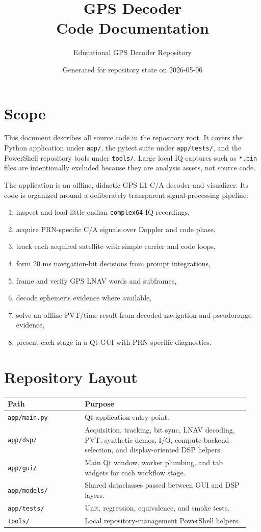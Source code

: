 \documentclass[11pt,a4paper]{article}
\title{GPS Decoder\\Code Documentation}
\author{Educational GPS Decoder Repository}
\date{Generated for repository state on 2026-05-06}
\newcommand{\codepath}[1]{\nolinkurl{#1}}
\begin{document}
\maketitle
\tableofcontents
\newpage

\section{Scope}

This document describes all source code in the repository root. It covers the Python application under \codepath{app/}, the pytest suite under \codepath{app/tests/}, and the PowerShell repository tools under \codepath{tools/}. Large local IQ captures such as \codepath{*.bin} files are intentionally excluded because they are analysis assets, not source code.

The application is an offline, didactic GPS L1 C/A decoder and visualizer. Its code is organized around a deliberately transparent signal-processing pipeline:

\begin{enumerate}
  \item inspect and load little-endian \codepath{complex64} IQ recordings,
  \item acquire PRN-specific C/A signals over Doppler and code phase,
  \item track each acquired satellite with simple carrier and code loops,
  \item form 20 ms navigation-bit decisions from prompt integrations,
  \item frame and verify GPS LNAV words and subframes,
  \item decode ephemeris evidence where available,
  \item solve an offline PVT/time result from decoded navigation and pseudorange evidence,
  \item present each stage in a Qt GUI with PRN-specific diagnostics.
\end{enumerate}

\section{Repository Layout}

\begin{longtable}{P{0.30\linewidth}L{0.64\linewidth}}
\textbf{Path} & \textbf{Purpose}\\
\hline
\codepath{app/main.py} & Qt application entry point.\\
\codepath{app/dsp/} & Acquisition, tracking, bit sync, LNAV decoding, PVT, synthetic demos, I/O, compute backend selection, and display-oriented DSP helpers.\\
\codepath{app/gui/} & Main Qt window, worker plumbing, and tab widgets for each workflow stage.\\
\codepath{app/models/} & Shared dataclasses passed between GUI and DSP layers.\\
\codepath{app/tests/} & Unit, regression, equivalence, and smoke tests.\\
\codepath{tools/} & Local repository-management PowerShell helpers.\\
\end{longtable}
\end{document}
